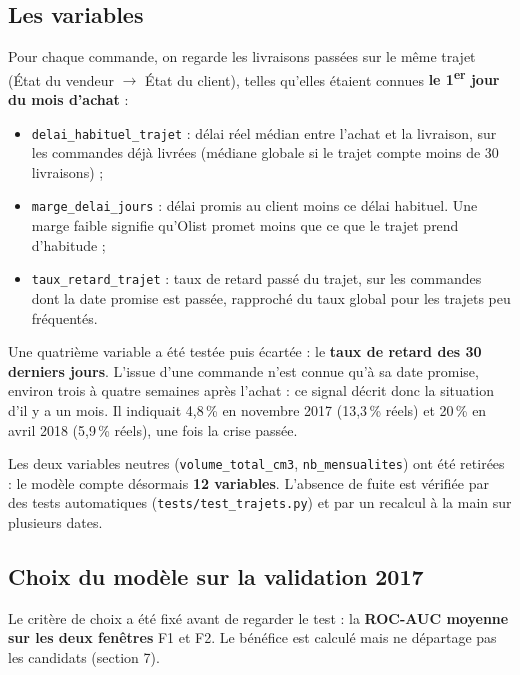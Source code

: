 \documentclass[11pt,a4paper]{article}
\newcommand{\var}[1]{\texttt{#1}}
\begin{document}
\subsection{Les variables}

Pour chaque commande, on regarde les livraisons passées sur le même trajet (État du vendeur
$\rightarrow$ État du client), telles qu'elles étaient connues \textbf{le 1\textsuperscript{er}
jour du mois d'achat} :
\begin{itemize}
  \item \var{delai\_habituel\_trajet} : délai réel médian entre l'achat et la livraison, sur les
        commandes déjà livrées (médiane globale si le trajet compte moins de 30 livraisons) ;
  \item \var{marge\_delai\_jours} : délai promis au client moins ce délai habituel. Une marge
        faible signifie qu'Olist promet moins que ce que le trajet prend d'habitude ;
  \item \var{taux\_retard\_trajet} : taux de retard passé du trajet, sur les commandes dont la
        date promise est passée, rapproché du taux global pour les trajets peu fréquentés.
\end{itemize}

Une quatrième variable a été testée puis écartée : le \textbf{taux de retard des 30 derniers
jours}. L'issue d'une commande n'est connue qu'à sa date promise, environ trois à quatre
semaines après l'achat : ce signal décrit donc la situation d'il y a un mois. Il indiquait
4,8\,\% en novembre 2017 (13,3\,\% réels) et 20\,\% en avril 2018 (5,9\,\% réels), une fois la
crise passée.

Les deux variables neutres (\var{volume\_total\_cm3}, \var{nb\_mensualites}) ont été retirées :
le modèle compte désormais \textbf{12 variables}. L'absence de fuite est vérifiée par des tests
automatiques (\var{tests/test\_trajets.py}) et par un recalcul à la main sur plusieurs dates.

\subsection{Choix du modèle sur la validation 2017}

Le critère de choix a été fixé avant de regarder le test : la \textbf{ROC-AUC moyenne sur les
deux fenêtres} F1 et F2. Le bénéfice est calculé mais ne départage pas les candidats (section 7).
\end{document}
